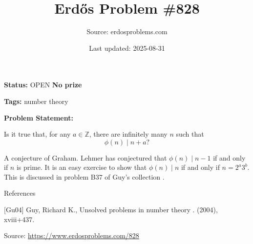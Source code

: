 \documentclass{article}
\title{Erd\H{o}s Problem \#828}
\date{Last updated: 2025-08-31}
\author{Source: erdosproblems.com}
\begin{document}
\maketitle

\noindent\textbf{Status:} OPEN \quad \textbf{No prize}

\noindent\textbf{Tags:} number theory

\medskip

\noindent\textbf{Problem Statement:}

Is it true that, for any $a\in\mathbb{Z}$, there are infinitely many $n$ such that\[\phi(n) \mid n+a?\]




A conjecture of Graham. Lehmer has conjectured that $\phi(n)\mid n-1$ if and only if $n$ is prime. It is an easy exercise to show that $\phi(n) \mid n$ if and only if $n=2^a3^b$. This is discussed in problem B37 of Guy's collection \cite{Gu04}.




References

[Gu04] Guy, Richard K., Unsolved problems in number theory . (2004), xviii+437.


\bigskip
\noindent\small{Source: \url{https://www.erdosproblems.com/828}}
\end{document}
